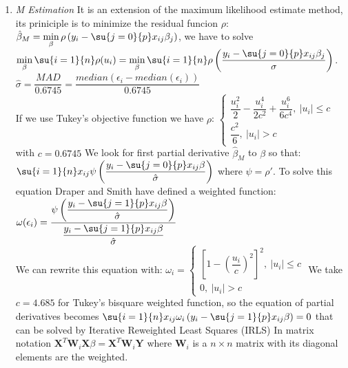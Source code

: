 \begin{enumerate}
	\item \emph{M Estimation}
		It is an extension of the maximum likelihood estimate method, its priniciple is to
		minimize the residual funcion $\rho$:
		$\hat{\beta}_{M}=\min\limits_{\beta}\rho\left(y_{i}-\su{{j=0}}{p}x_{ij}\beta_{j}
		\right)$, we have to solve $\min\limits_{\beta}\su{{i=1}}{n}\rho(u_{i})=\min\limits_{\beta}\su{{i=1}}{n}\rho\left(\dfrac{y_{i}-\su{{j=0}}{p}
		x_{ij}\beta_{j}}{\sigma}\right)$.\\
		$\hat{\sigma}=\dfrac{MAD}{0.6745}=\dfrac{median\left(\epsilon_{i}-median(\epsilon_{i})\right)}{0.6745}$\\
		If we use Tukey's objective function we have
		$\rho$:
		$\begin{cases}
			\dfrac{u_{i}^{2}}{2} - \dfrac{u_{i}^{4}}{2c^{2}} + \dfrac{u_{i}^{6}}{6c^{4}},~
			|u_{i}| \leq c\\
			\dfrac{c^{2}}{6},~|u_{i}|>c
		\end{cases}$\\
		with $c=0.6745$
		We look for first partial derivative $\hat{\beta}_{M}$ to $\beta$ so that:\\
		$\su{{i=1}}{n}x_{ij}\psi\left(\dfrac{y_{i}-\su{{j=0}}{p}x_{ij}\beta}{\hat{\sigma}}
		\right)$ where $\psi=\rho'$. To solve this equation Draper and Smith have defined 
		a weighted function: 
		$\omega(\epsilon_{i})=
		\dfrac{\psi\left(\dfrac{y_{i}-\su{{j=1}}{p}x_{ij}\beta}{\hat{\sigma}}\right)}
		{\dfrac{y_{i}-\su{{j=1}}{p}x_{ij}\beta}{\hat{\sigma}}}$\\
		We can rewrite this equation with:
		$\omega_{i}=\begin{cases}
			\left[ 1-\left(\dfrac{u_{i}}{c}\right)^{2}\right]^{2},~|u_{i}| \leq c\\
			0,~|u_{i}| > c
		\end{cases}
		$
		We take $c=4.685$ for Tukey's bisquare weighted function, so the equation of partial
		derivatives becomes $\su{{i=1}}{n}x_{ij}\omega_{i}\left(y_{i}-\su{{j=1}}{p}x_{ij}
		\beta\right)=0$ that can be solved by Iterative Reweighted Least Squares (IRLS)
		In matrix notation $\bm{X}^{T}\bm{W}_{i}\bm{X}\beta = \bm{X}^{T}\bm{W}_{i}\bm{Y}$
		where $\bm{W}_{i}$ is a $n\times n$ matrix with its diagonal elements are the 
		weighted.


\end{enumerate}
